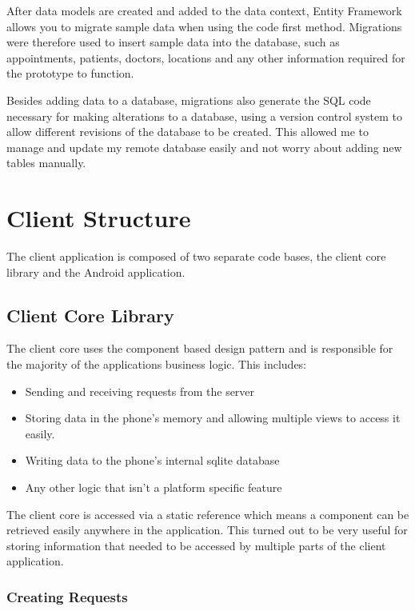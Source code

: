 After data models are created and added to the data context, Entity Framework allows you to migrate sample data when using the code first method. Migrations were therefore used to insert sample data into the database, such as appointments, patients, doctors, locations and any other information required for the prototype to function.

Besides adding data to a database, migrations also generate the SQL code necessary for making alterations to a database, using a version control system to allow different revisions of the database to be created. This allowed me to manage and update my remote database easily and not worry about adding new tables manually.

\section{Client Structure}

The client application is composed of two separate code bases, the client core library and the Android application.

\subsection{Client Core Library}

The client core uses the component based design pattern and is responsible for the majority of the applications business logic. This includes:

\begin{itemize}
	\item Sending and receiving requests from the server
	\item Storing data in the phone's memory and allowing multiple views to access it easily.
	\item Writing data to the phone's internal sqlite database
	\item Any other logic that isn't a platform specific feature
\end{itemize}

The client core is accessed via a static reference which means a component can be retrieved easily anywhere in the application. This turned out to be very useful for storing information that needed to be accessed by multiple parts of the client application.

\subsubsection{Creating Requests}

